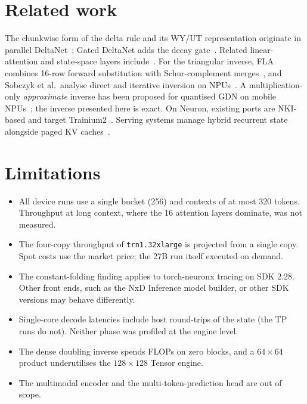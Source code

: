 \documentclass[11pt]{article}
\theoremstyle{remark}
\begin{document}
\section{Related work}
The chunkwise form of the delta rule and its WY/UT representation originate in parallel
DeltaNet~\cite{yang2024deltanet,bischof1987wy,joffrain2006ut}; Gated DeltaNet adds the decay gate~\cite{yang2025gdn}. Related
linear-attention and state-space layers include~\cite{katharopoulos2020,schlag2021,yang2024gla,dao2024mamba2}. For the
triangular inverse, FLA combines 16-row forward substitution with Schur-complement merges~\cite{fla}, and Sobczyk et al.\
analyse direct and iterative inversion on NPUs~\cite{sobczyk2026tri}. A multiplication-only \emph{approximate} inverse has been
proposed for quantised GDN on mobile NPUs~\cite{zhang2026goodenough}; the inverse presented here is exact. On Neuron, existing
ports are NKI-based and target Trainium2~\cite{nxdicontrib,nkilibgdn,jburtoft}. Serving systems manage hybrid recurrent state
alongside paged KV caches~\cite{vllmhybrid,sglanghybrid}.

\section{Limitations}
\begin{itemize}
\item All device runs use a single bucket (256) and contexts of at most 320 tokens. Throughput at long context, where the 16
attention layers dominate, was not measured.
\item The four-copy throughput of \texttt{trn1.32xlarge} is projected from a single copy. Spot costs use the market price; the
27B run itself executed on demand.
\item The constant-folding finding applies to torch-neuronx tracing on SDK 2.28. Other front ends, such as the NxD Inference
model builder, or other SDK versions may behave differently.
\item Single-core decode latencies include host round-trips of the state (the TP runs do not). Neither phase was profiled at
the engine level.
\item The dense doubling inverse spends FLOPs on zero blocks, and a $64\times64$ product underutilises the $128\times128$
Tensor engine.
\item The multimodal encoder and the multi-token-prediction head are out of scope.
\end{itemize}
\end{document}
